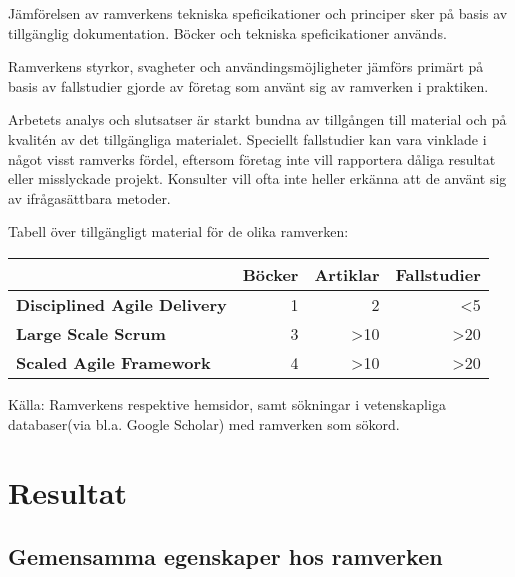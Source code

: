 	Jämförelsen av ramverkens tekniska speficikationer och principer sker på basis av tillgänglig dokumentation. Böcker och tekniska speficikationer används.
	\linebreak
	
	Ramverkens styrkor, svagheter och användingsmöjligheter jämförs primärt på basis av fallstudier gjorde av företag som använt sig av ramverken i praktiken.
	
	
	
	Arbetets analys och slutsatser är starkt bundna av tillgången till material och på kvalitén av det tillgängliga materialet. Speciellt fallstudier kan vara vinklade i något visst ramverks fördel, eftersom företag inte vill rapportera dåliga resultat eller misslyckade projekt. Konsulter vill ofta inte heller erkänna att de använt sig av ifrågasättbara metoder.
	
	
	Tabell över tillgängligt material för de olika ramverken:

	\begin{center}
	\begin{tabular}{ >{\bfseries}l | r | r | r }
		 	 						& Böcker & Artiklar & Fallstudier 	\\ \hline
		Disciplined Agile Delivery 	& 1 	& 2			& <5 			\\ \hline
		Large Scale Scrum 			& 3 	& >10		& >20 			\\ \hline
		Scaled Agile Framework 		& 4 	& >10		& >20 			\\ 
	\end{tabular}
	\end{center}
	
	Källa: Ramverkens respektive hemsidor\cite{dad_web, less_web, safe_web}, samt sökningar i vetenskapliga databaser(via bl.a. Google Scholar) med ramverken som sökord.
	
	
	
\newpage
\section{Resultat}
	
		
	
	\subsection{Gemensamma egenskaper hos ramverken}
		
